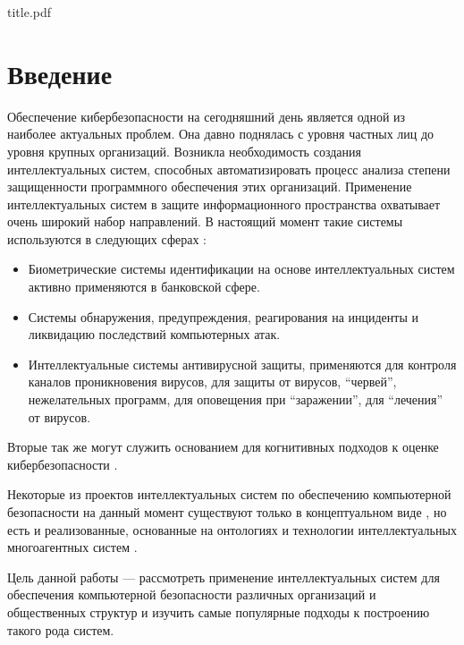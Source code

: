 

\def\oldbibitem{}
\let\oldbibitem=\bibitem
\def\bibitem{\stepcounter{citenum}\oldbibitem}



{title.pdf}

\tableofcontents
\newpage

\section{Введение}
Обеспечение кибербезопасности на сегодняшний день является одной из наиболее актуальных проблем.
Она давно поднялась с уровня частных лиц до уровня крупных организаций. Возникла необходимость
создания интеллектуальных систем, способных автоматизировать процесс анализа степени защищенности
программного обеспечения этих организаций. Применение интеллектуальных систем в защите
информационного пространства охватывает очень широкий набор направлений.
В настоящий момент такие системы используются в следующих сферах \cite{spheres}:

\begin{itemize}
\item
Биометрические системы идентификации на основе интеллектуальных
систем активно применяются в банковской сфере.
\item
Системы обнаружения,
предупреждения, реагирования на инциденты и ликвидацию последствий компьютерных атак.
\item
Интеллектуальные системы антивирусной защиты, применяются для контроля каналов проникновения вирусов,
для защиты от вирусов, ``червей'', нежелательных программ, для оповещения при ``заражении'', для ``лечения''
от вирусов.
\end{itemize}

Вторые так же могут служить основанием для когнитивных подходов к оценке кибербезопасности \cite{kognmodels}.

Некоторые из проектов интеллектуальных систем по обеспечению компьютерной безопасности
на данный момент существуют только в концептуальном виде \cite{concept}, но есть и реализованные,
основанные на онтологиях и технологии интеллектуальных многоагентных систем \cite{multigent}.

Цель данной работы --- рассмотреть применение интеллектуальных систем для обеспечения компьютерной
безопасности различных организаций и общественных структур и изучить самые популярные подходы
к построению такого рода систем.

